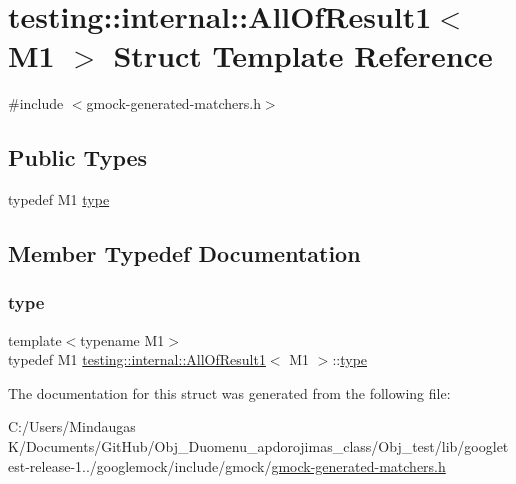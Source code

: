 \hypertarget{structtesting_1_1internal_1_1_all_of_result1}{}\section{testing\+::internal\+::All\+Of\+Result1$<$ M1 $>$ Struct Template Reference}
\label{structtesting_1_1internal_1_1_all_of_result1}


{\ttfamily \#include $<$gmock-\/generated-\/matchers.\+h$>$}

\subsection*{Public Types}
\begin{DoxyCompactItemize}
\item 
typedef M1 \mbox{\hyperlink{structtesting_1_1internal_1_1_all_of_result1_a19b95d4ddf7f4044a78665d9e253db10}{type}}
\end{DoxyCompactItemize}


\subsection{Member Typedef Documentation}
\mbox{\label{structtesting_1_1internal_1_1_all_of_result1_a19b95d4ddf7f4044a78665d9e253db10}} 
\subsubsection{\texorpdfstring{type}{type}}
{\footnotesize\ttfamily template$<$typename M1$>$ \\
typedef M1 \mbox{\hyperlink{structtesting_1_1internal_1_1_all_of_result1}{testing\+::internal\+::\+All\+Of\+Result1}}$<$ M1 $>$\+::\mbox{\hyperlink{structtesting_1_1internal_1_1_all_of_result1_a19b95d4ddf7f4044a78665d9e253db10}{type}}}



The documentation for this struct was generated from the following file\+:\begin{DoxyCompactItemize}
\item 
C\+:/\+Users/\+Mindaugas K/\+Documents/\+Git\+Hub/\+Obj\+\_\+\+Duomenu\+\_\+apdorojimas\+\_\+class/\+Obj\+\_\+test/lib/googletest-\/release-\/1../googlemock/include/gmock/\mbox{\hyperlink{_obj__test_2lib_2googletest-release-1_88_81_2googlemock_2include_2gmock_2gmock-generated-matchers_8h}{gmock-\/generated-\/matchers.\+h}}\end{DoxyCompactItemize}

